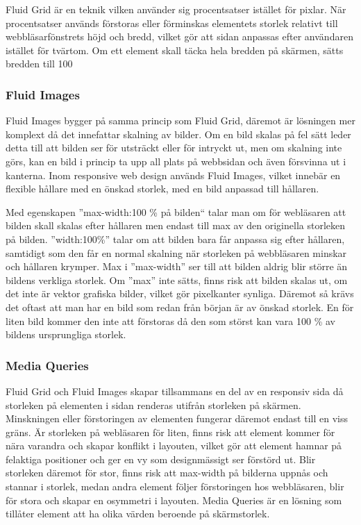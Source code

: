 \documentclass[11pt]{article}
\begin{document}
Fluid Grid är en teknik vilken använder sig procentsatser istället för pixlar. När procentsatser används förstoras eller förminskas elementets storlek relativt till webbläsarfönstrets höjd och bredd, vilket gör att sidan anpassas efter användaren istället för tvärtom. Om ett element skall täcka hela bredden på skärmen, sätts bredden till 100 %

\subsubsection{Fluid Images}
Fluid Images bygger på samma princip som Fluid Grid, däremot är lösningen mer komplext då det innefattar skalning av bilder. Om en bild skalas på fel sätt leder detta till att bilden ser för utsträckt eller för intryckt ut, men om skalning inte görs, kan en bild i princip ta upp all plats på webbsidan och även försvinna ut i kanterna. Inom responsive web design används Fluid Images, vilket innebär en flexible hållare med en önskad storlek, med en bild anpassad till hållaren.  

Med egenskapen ”max-width:100 \% på bilden“ talar man om för webläsaren att bilden skall skalas efter hållaren men endast till max av den originella storleken på bilden. ”width:100\%” talar om att bilden bara får anpassa sig efter hållaren, samtidigt som den får en normal skalning när storleken på webbläsaren minskar och hållaren krymper. Max i ”max-width” ser till att bilden aldrig blir större än bildens verkliga storlek. Om ”max” inte sätts, finns risk att bilden skalas ut, om det inte är vektor grafiska bilder, vilket gör pixelkanter synliga. Däremot så krävs det oftast att man har en bild som redan från början är av önskad storlek. En för liten bild kommer den inte att förstoras då den som störst kan vara 100 \% av bildens ursprungliga storlek.

\subsubsection{Media Queries}
Fluid Grid och Fluid Images skapar tillsammans en del av en responsiv sida då storleken på elementen i sidan renderas utifrån storleken på skärmen. Minskningen eller förstoringen av elementen fungerar däremot endast till en viss gräns. Är storleken på webläsaren för liten, finns risk att element kommer för nära varandra och skapar konflikt i layouten, vilket gör att element hamnar på felaktiga positioner och ger en vy som designmässigt ser förstörd ut. Blir storleken däremot för stor, finns risk att max-width på bilderna uppnås och stannar i storlek, medan andra element följer förstoringen hos webbläsaren, blir för stora och skapar en osymmetri i layouten. Media Queries är en lösning som tillåter element att ha olika värden beroende på skärmstorlek.
\end{document}

